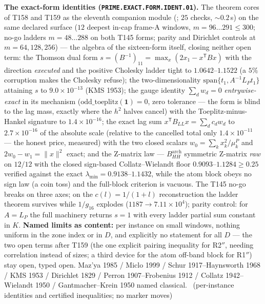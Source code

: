 \par\smallskip\noindent\textbf{The exact-form identities
(\texttt{PRIME.EXACT.FORM.IDENT.01}).}
The theorem cores of T158 and T159 as the eleventh companion module
(; $25$ checks, ${\sim}0.2$\,s)
on the same declared surface ($12$ deepest in-cap frame-A windows,
$m=96\ldots291\le300$; no-go ladders $m=48\ldots288$ on both T145 forms;
parity and Dirichlet controls at $m=64,128,256$) --- the algebra of the
sixteen-form itself, closing neither open term: the Thomson dual form
$s=(B^{-1})_{11}=\max_x(2x_1-x^{\mathsf T}Bx)$ with the direction
\emph{executed} and the positive Cholesky ladder tight to
$1.0642$--$1.1522$ (a $5\%$ corruption makes the Cholesky refuse); the
two-dimensionality $\mathrm{span}\{t_1,A^{-1}L_Pt_1\}$ attaining $s$ to
$9.0\times10^{-13}$ (KMS 1953); the gauge identity $\sum_dw_d=0$
\emph{entrywise-exact} in its mechanism ($\mathrm{odd\_toeplitz}
(\mathbf 1)=0$, zero tolerance --- the form is blind to the lag mass,
exactly where the $h^2$ halves cancel) with the Toeplitz-minus-Hankel
signature to $1.4\times10^{-16}$; the exact lag sum
$x^{\mathsf T}B_{LL}x=\sum_dc_dw_d$ to $2.7\times10^{-16}$ of the
absolute scale (relative to the cancelled total only
$1.4\times10^{-11}$ --- the honest price, measured) with the two closed
scalars $w_0=\sum_kx_k^2/\mu^P_k$ and $2w_0-w_1=\|x\|^2$ exact; and the
Z-matrix law --- $B^{\mathrm{arch}}_{HH}$ symmetric Z-matrix \emph{raw}
on $12/12$ with the closed sign-based Collatz--Wielandt floor
$0.9093$--$1.1284\ge0.25$ verified against the exact
$\lambda_{\min}=0.9138$--$1.1432$, while the atom block obeys no sign
law (a coin toss) and the full-block criterion is vacuous. The T145
no-go breaks on three axes; on the $c(l)=1/(1+l)$ reconstruction the
ladder theorem survives while $1/g_{16}$ explodes
($1187\to7.11\times10^{4}$); parity control: for $A=L_P$ the full
machinery returns $s=1$ with every ladder partial sum constant in $K$.
\textbf{Named limits as content:} per instance on small windows, nothing
uniform in the zone index or in $D$, and explicitly no statement for all
$D$ --- the two open terms after T159 (the one explicit pairing
inequality for R2$''$, needing correlation instead of sizes; a third
device for the atom off-band block for R1$''$) stay open, typed open.
Maz'ya 1985 / Miclo 1999 / Schur 1917--Haynsworth 1968 / KMS 1953 /
Dirichlet 1829 / Perron 1907--Frobenius 1912 / Collatz 1942--Wielandt
1950 / Gantmacher--Krein 1950 named classical.
\mE\ (per-instance identities and certified inequalities; no marker moves)
\par\smallskip


